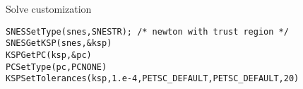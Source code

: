 \begin{numberedframe}{Solve customization}
\begin{verbatim}
SNESSetType(snes,SNESTR); /* newton with trust region */
SNESGetKSP(snes,&ksp)
KSPGetPC(ksp,&pc)
PCSetType(pc,PCNONE)
KSPSetTolerances(ksp,1.e-4,PETSC_DEFAULT,PETSC_DEFAULT,20)
\end{verbatim}
\end{numberedframe}

\endinput

PetscMPIInt    size,rank;
PetscScalar    pfive = .5,*xx;
PetscTruth     flg;
AppCtx         user;         /* user-defined work context */
IS             isglobal,islocal;

/* ------------------------------------------------------------------- */
#undef __FUNCT__
#define __FUNCT__ "FormJacobian2"

